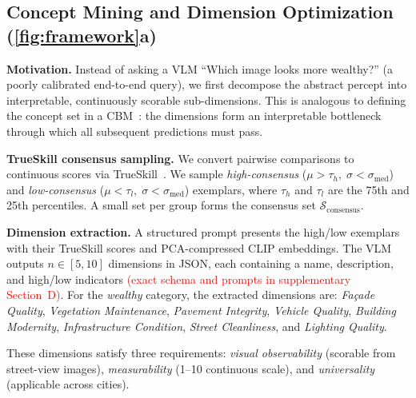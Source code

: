 \documentclass[runningheads]{llncs}
\begin{document}
\subsection{Concept Mining and Dimension Optimization (\cref{fig:framework}a)}
\label{sec:stage1}

\noindent\textbf{Motivation.}
Instead of asking a VLM ``Which image looks more wealthy?'' (a poorly calibrated end-to-end query), we first decompose the abstract percept into interpretable, continuously scorable sub-dimensions.
This is analogous to defining the concept set in a CBM~\cite{koh2020concept}: the dimensions form an interpretable bottleneck through which all subsequent predictions must pass.

\smallskip\noindent\textbf{TrueSkill consensus sampling.}
We convert pairwise comparisons to continuous scores via TrueSkill~\cite{herbrich2006trueskill}.
We sample \emph{high-consensus} ($\mu{>}\tau_{h},\;\sigma{<}\sigma_{\mathrm{med}}$) and \emph{low-consensus} ($\mu{<}\tau_{l},\;\sigma{<}\sigma_{\mathrm{med}}$) exemplars, where $\tau_{h}$ and $\tau_{l}$ are the 75th and 25th percentiles.
A small set per group forms the consensus set $\mathcal{S}_{\mathrm{consensus}}$.

\smallskip\noindent\textbf{Dimension extraction.}
A structured prompt presents the high/low exemplars with their TrueSkill scores and PCA-compressed CLIP embeddings.
The VLM outputs $n\in[5,10]$ dimensions in JSON, each containing a name, description, and high/low indicators \textcolor{red}{(exact schema and prompts in supplementary Section~D)}.
For the \emph{wealthy} category, the extracted dimensions are:
\emph{Fa\c{c}ade Quality}, \emph{Vegetation Maintenance}, \emph{Pavement Integrity}, \emph{Vehicle Quality}, \emph{Building Modernity}, \emph{Infrastructure Condition}, \emph{Street Cleanliness}, and \emph{Lighting Quality}.

These dimensions satisfy three requirements: \emph{visual observability} (scorable from street-view images), \emph{measurability} (1--10 continuous scale), and \emph{universality} (applicable across cities).
\end{document}
